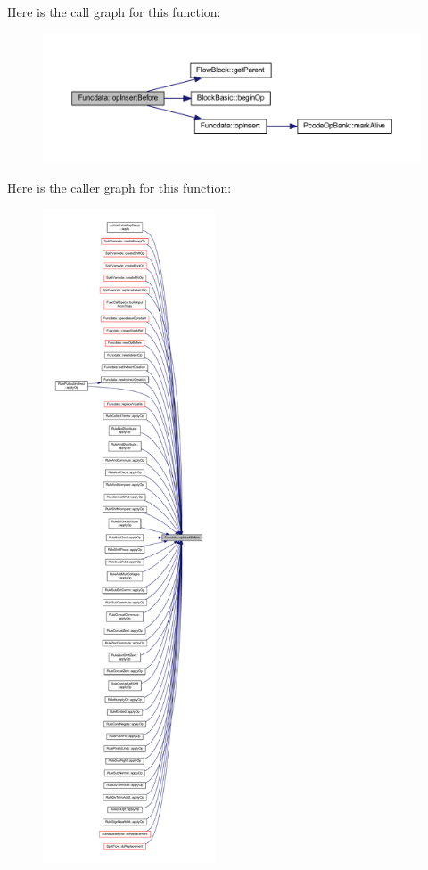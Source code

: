 Here is the call graph for this function\+:
\nopagebreak
\begin{figure}[H]
\begin{center}
\leavevmode
\includegraphics[width=350pt]{class_funcdata_a9dd86e17a47020d06ac8dfd3bb732fe5_cgraph}
\end{center}
\end{figure}
Here is the caller graph for this function\+:
\nopagebreak
\begin{figure}[H]
\begin{center}
\leavevmode
\includegraphics[height=550pt]{class_funcdata_a9dd86e17a47020d06ac8dfd3bb732fe5_icgraph}
\end{center}
\end{figure}
\mbox{\label{class_funcdata_ae6341eb8ca8a8004f1c77a8e8147a286}} 
